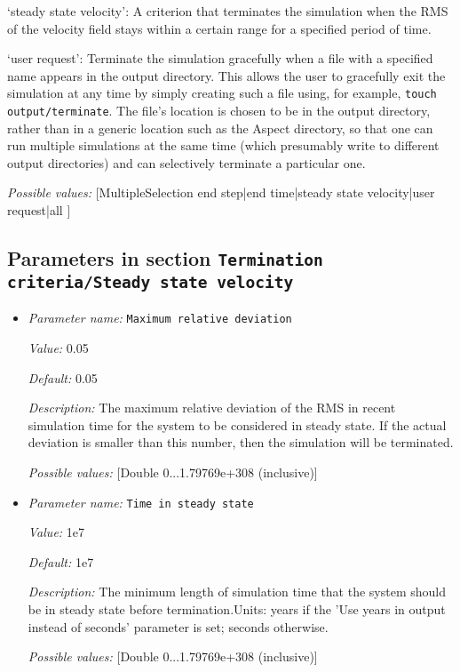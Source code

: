 \begin{itemize}
`steady state velocity': A criterion that terminates the simulation when the RMS of the velocity field stays within a certain range for a specified period of time.

`user request': Terminate the simulation gracefully when a file with a specified name appears in the output directory. This allows the user to gracefully exit the simulation at any time by simply creating such a file using, for example, \texttt{touch output/terminate}. The file's location is chosen to be in the output directory, rather than in a generic location such as the Aspect directory, so that one can run multiple simulations at the same time (which presumably write to different output directories) and can selectively terminate a particular one.


{\it Possible values:} [MultipleSelection end step|end time|steady state velocity|user request|all ]
\end{itemize}



\subsection{Parameters in section \tt Termination criteria/Steady state velocity}
\label{parameters:Termination_20criteria/Steady_20state_20velocity}

\begin{itemize}
\item {\it Parameter name:} {\tt Maximum relative deviation}


{\it Value:} 0.05


{\it Default:} 0.05


{\it Description:} The maximum relative deviation of the RMS in recent simulation time for the system to be considered in steady state. If the actual deviation is smaller than this number, then the simulation will be terminated.


{\it Possible values:} [Double 0...1.79769e+308 (inclusive)]
\item {\it Parameter name:} {\tt Time in steady state}


{\it Value:} 1e7


{\it Default:} 1e7


{\it Description:} The minimum length of simulation time that the system should be in steady state before termination.Units: years if the 'Use years in output instead of seconds' parameter is set; seconds otherwise.


{\it Possible values:} [Double 0...1.79769e+308 (inclusive)]
\end{itemize}

